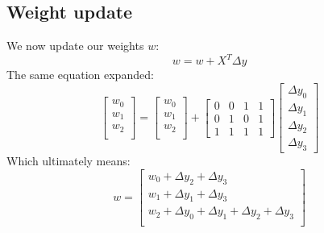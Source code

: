 \documentclass[10pt,a4paper]{article}
\begin{document}
\subsection{Weight update}
We now update our weights $w$:
\begin{equation}
	w = w + X^T\Delta{y}
\end{equation}
The same equation expanded:
\begin{equation}
	\begin{bmatrix}
		w_0 \\
		w_1 \\
		w_2 \\
	\end{bmatrix}
	=
	\begin{bmatrix}
		w_0 \\
		w_1 \\
		w_2 \\
	\end{bmatrix}
	+
	\begin{bmatrix}
		0 & 0 & 1 & 1 \\
		0 & 1 & 0 & 1 \\
		1 & 1 & 1 & 1
	\end{bmatrix}
	\begin{bmatrix}
		\Delta{y_0} \\
		\Delta{y_1} \\
		\Delta{y_2} \\
		\Delta{y_3}
	\end{bmatrix}
\end{equation}
Which ultimately means:
\begin{equation}
	w =
	\begin{bmatrix}
		w_0 + \Delta{y_2} + \Delta{y_3} \\
		w_1 + \Delta{y_1} + \Delta{y_3} \\
		w_2 + \Delta{y_0} + \Delta{y_1} + \Delta{y_2} + \Delta{y_3} \\
	\end{bmatrix}
\end{equation}
\end{document}
